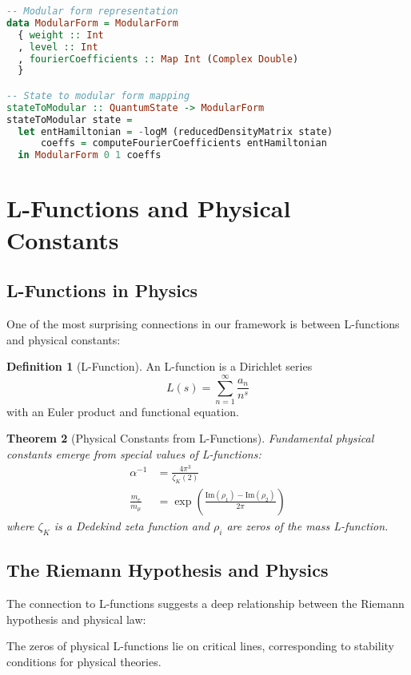 \documentclass[12pt,a4paper]{article}
\theoremstyle{plain}
\newtheorem{theorem}{Theorem}[section]
\theoremstyle{definition}
\newtheorem{definition}[theorem]{Definition}
\theoremstyle{remark}
\begin{document}
\begin{lstlisting}[language=Haskell, basicstyle=\small]
-- Modular form representation
data ModularForm = ModularForm
  { weight :: Int
  , level :: Int
  , fourierCoefficients :: Map Int (Complex Double)
  }

-- State to modular form mapping
stateToModular :: QuantumState -> ModularForm
stateToModular state = 
  let entHamiltonian = -logM (reducedDensityMatrix state)
      coeffs = computeFourierCoefficients entHamiltonian
  in ModularForm 0 1 coeffs
\end{lstlisting}

\section{L-Functions and Physical Constants}

\subsection{L-Functions in Physics}

One of the most surprising connections in our framework is between L-functions and physical constants:

\begin{definition}[L-Function]
An L-function is a Dirichlet series
\[L(s) = \sum_{n=1}^{\infty} \frac{a_n}{n^s}\]
with an Euler product and functional equation.
\end{definition}

\begin{theorem}[Physical Constants from L-Functions]
Fundamental physical constants emerge from special values of L-functions:
\begin{align}
\alpha^{-1} &= \frac{4\pi^3}{\zeta_K(2)} \\
\frac{m_e}{m_\mu} &= \exp\left(\frac{\text{Im}(\rho_1) - \text{Im}(\rho_2)}{2\pi}\right)
\end{align}
where $\zeta_K$ is a Dedekind zeta function and $\rho_i$ are zeros of the mass L-function.
\end{theorem}

\subsection{The Riemann Hypothesis and Physics}

The connection to L-functions suggests a deep relationship between the Riemann hypothesis and physical law:

\begin{conjecture}
The zeros of physical L-functions lie on critical lines, corresponding to stability conditions for physical theories.
\end{conjecture}
\end{document}
